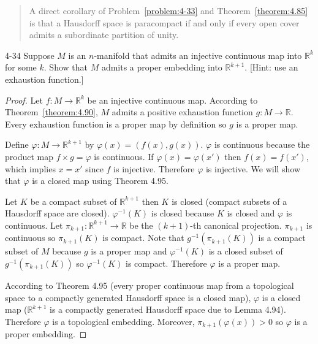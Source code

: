 \begin{quotation}
	A direct corollary of Problem~\ref{problem:4-33} and Theorem~\ref{theorem:4.85} is that a Hausdorff space is paracompact if and only if every open cover admits a subordinate partition of unity.
\end{quotation}

\begin{problem}{4-34}
Suppose $M$ is an $n$-manifold that admits an injective continuous map into $\mathbb{R}^{k}$ for some $k$. Show that $M$ admits a proper embedding into $\mathbb{R}^{k+1}$. [Hint: use an exhaustion function.]
\end{problem}

\begin{proof}
	Let $f: M\to \mathbb{R}^{k}$ be an injective continuous map. According to Theorem~\ref{theorem:4.90}, $M$ admits a positive exhaustion function $g: M \to \mathbb{R}$. Every exhaustion function is a proper map by definition so $g$ is a proper map.

	Define $\varphi: M \to \mathbb{R}^{k+1}$ by $\varphi(x) = (f(x), g(x))$. $\varphi$ is continuous because the product map $f\times g = \varphi$ is continuous. If $\varphi(x) = \varphi(x')$ then $f(x) = f(x')$, which implies $x = x'$ since $f$ is injective. Therefore $\varphi$ is injective. We will show that $\varphi$ is a closed map using Theorem 4.95.

	Let $K$ be a compact subset of $\mathbb{R}^{k+1}$ then $K$ is closed (compact subsets of a Hausdorff space are closed). $\varphi^{-1}(K)$ is closed because $K$ is closed and $\varphi$ is continuous. Let $\pi_{k+1}: \mathbb{R}^{k+1} \to \mathbb{R}$ be the $(k+1)$-th canonical projection. $\pi_{k+1}$ is continuous so $\pi_{k+1}(K)$ is compact. Note that $g^{-1}(\pi_{k+1}(K))$ is a compact subset of $M$ because $g$ is a proper map and $\varphi^{-1}(K)$ is a closed subset of $g^{-1}(\pi_{k+1}(K))$ so $\varphi^{-1}(K)$ is compact. Therefore $\varphi$ is a proper map.

	According to Theorem 4.95 (every proper continuous map from a topological space to a compactly generated Hausdorff space is a closed map), $\varphi$ is a closed map ($\mathbb{R}^{k+1}$ is a compactly generated Hausdorff space due to Lemma 4.94). Therefore $\varphi$ is a topological embedding. Moreover, $\pi_{k+1}(\varphi(x)) > 0$ so $\varphi$ is a proper embedding.
\end{proof}
